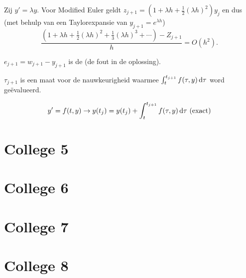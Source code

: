 \documentclass{2wn20summary}
\begin{document}
			\begin{voorbeeld}
				Zij $y'=\lambda y$.
				Voor Modified Euler geldt $ z_{j+1} = (1+\lambda h + \frac{1}{2} (\lambda h)^2)y_j $ en dus (met behulp van een Taylorexpansie van $y_{j+1}=e^{\lambda h}$)
				\[
					\frac{(1+\lambda h + \frac{1}{2}(\lambda h)^2 + \frac{1}{3}(\lambda h)^3+\dotsm) - Z_{j+1}}{h} = O(h^2).
				 \]
			\end{voorbeeld}

			\begin{define}

				$e_{j+1}=w_{j+1}-y_{j+1}$ is de  (de fout in de oplossing).
			\end{define}
			$\tau_{j+1}$ is een maat voor de nauwkeurigheid waarmee $\int_t^{t_{j+1}} f(\tau,y) \mathop{}\!\mathrm{d} \tau$ word ge\"evalueerd.

			\[
				y'=f(t,y) \to y(t_j) = y(t_j) + \int_t^{t_{j+1}} f(\tau,y) \mathop{}\!\mathrm{d} \tau \text{ (exact)}
			 \] %






	\section{College 5}

	\section{College 6}

	\section{College 7}

	\section{College 8}


	\newpage
	\printindex
	
	
\end{document}
